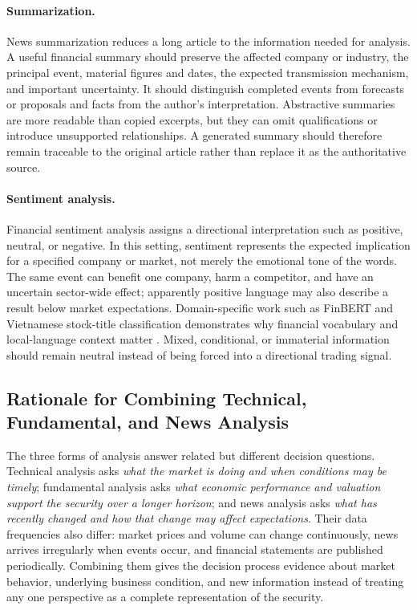 \paragraph{Summarization.}

News summarization reduces a long article to the information needed for analysis. A useful financial summary should preserve the affected company or industry, the principal event, material figures and dates, the expected transmission mechanism, and important uncertainty. It should distinguish completed events from forecasts or proposals and facts from the author's interpretation. Abstractive summaries are more readable than copied excerpts, but they can omit qualifications or introduce unsupported relationships. A generated summary should therefore remain traceable to the original article rather than replace it as the authoritative source.

\paragraph{Sentiment analysis.}

Financial sentiment analysis assigns a directional interpretation such as positive, neutral, or negative. In this setting, sentiment represents the expected implication for a specified company or market, not merely the emotional tone of the words. The same event can benefit one company, harm a competitor, and have an uncertain sector-wide effect; apparently positive language may also describe a result below market expectations. Domain-specific work such as FinBERT and Vietnamese stock-title classification demonstrates why financial vocabulary and local-language context matter \cite{araci2019finbert,tung2021phobert}. Mixed, conditional, or immaterial information should remain neutral instead of being forced into a directional trading signal.

\subsection{Rationale for Combining Technical, Fundamental, and News Analysis}
\label{subsec:combined-financial-analysis-foundations}

The three forms of analysis answer related but different decision questions. Technical analysis asks \textit{what the market is doing and when conditions may be timely}; fundamental analysis asks \textit{what economic performance and valuation support the security over a longer horizon}; and news analysis asks \textit{what has recently changed and how that change may affect expectations}. Their data frequencies also differ: market prices and volume can change continuously, news arrives irregularly when events occur, and financial statements are published periodically. Combining them gives the decision process evidence about market behavior, underlying business condition, and new information instead of treating any one perspective as a complete representation of the security.

